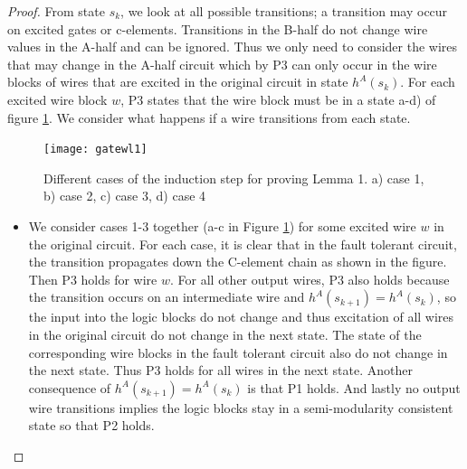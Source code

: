 \documentclass[12pt]{report}
\begin{document}
\begin{proof}
From state $s_k$, we look at all possible transitions; a transition may occur on excited gates or c-elements.  Transitions in the B-half do not change wire values in the A-half and can be ignored.  Thus we only need to consider the wires that may change in the A-half circuit which by P3 can only occur in the wire blocks of wires that are excited in the original circuit in state $h^A(s_k)$.  For each excited wire block $w$, %
P3 states that the wire block must be in a state a-d) of figure \ref{fig:l1helper}.  We consider what happens if a wire transitions from each state. 
\begin{figure}
  \centering
    \texttt{[image: gatewl1]}
  \caption{Different cases of the induction step for proving Lemma 1.  a) case 1, b) case 2, c) case 3, d) case 4}
  \label{fig:l1helper}
\end{figure}


\begin{itemize}
\item We consider cases 1-3 together (a-c in Figure \ref{fig:l1helper}) for some excited wire $w$ in the original circuit.  For each case, it is clear that in the fault tolerant circuit, the transition propagates down the C-element chain as shown in the figure.  Then P3 holds for wire $w$.  For all other output wires, P3 also holds because the transition occurs on an intermediate wire and $h^A(s_{k+1})=h^A(s_{k})$, so the input into the logic blocks do not change and thus excitation of all wires in the original circuit do not change in the next state.  The state of the corresponding wire blocks in the fault tolerant circuit also do not change in the next state.  Thus P3 holds for all wires in the next state.  Another consequence of $h^A(s_{k+1})=h^A(s_k)$ is that P1 holds.  And lastly no output wire transitions implies the logic blocks stay in a semi-modularity consistent state so that P2 holds.


\end{itemize}
\end{proof}
\end{document}
